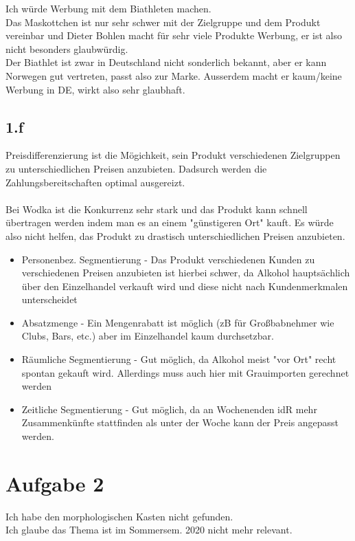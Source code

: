 Ich würde Werbung mit dem Biathleten machen. \\
Das Maskottchen ist nur sehr schwer mit der Zielgruppe und dem Produkt vereinbar und Dieter Bohlen macht für sehr viele Produkte Werbung, er ist also nicht besonders glaubwürdig. \\
Der Biathlet ist zwar in Deutschland nicht sonderlich bekannt, aber er kann Norwegen gut vertreten, passt also zur Marke. Ausserdem macht er kaum/keine Werbung in DE, wirkt also sehr glaubhaft. 

\subsection*{1.f}
Preisdifferenzierung ist die Mögichkeit, sein Produkt verschiedenen Zielgruppen zu unterschiedlichen Preisen anzubieten. Dadsurch werden die Zahlungsbereitschaften optimal ausgereizt. \\
\\
Bei Wodka ist die Konkurrenz sehr stark und das Produkt kann schnell übertragen werden indem man es an einem "günstigeren Ort" kauft. Es würde also nicht helfen, das Produkt zu drastisch unterschiedlichen Preisen anzubieten. \\
\begin{itemize}
    \item Personenbez. Segmentierung - Das Produkt verschiedenen Kunden zu verschiedenen Preisen anzubieten ist hierbei schwer, da Alkohol hauptsächlich über den Einzelhandel verkauft wird und diese nicht nach Kundenmerkmalen unterscheidet
    \item Absatzmenge - Ein Mengenrabatt ist möglich (zB für Großbabnehmer wie Clubs, Bars, etc.) aber im Einzelhandel kaum durchsetzbar.
    \item Räumliche Segmentierung - Gut möglich, da Alkohol meist "vor Ort" recht spontan gekauft wird. Allerdings muss auch hier mit Grauimporten gerechnet werden
    \item Zeitliche Segmentierung - Gut möglich, da an Wochenenden idR mehr Zusammenkünfte stattfinden als unter der Woche kann der Preis angepasst werden.
\end{itemize}

\section*{Aufgabe 2}
Ich habe den morphologischen Kasten nicht gefunden. \\
Ich glaube das Thema ist im Sommersem. 2020 nicht mehr relevant.
